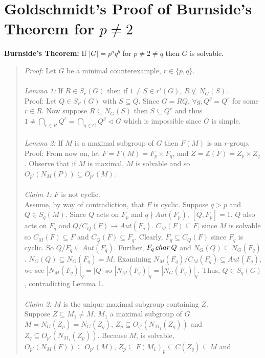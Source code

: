 \section{Goldschmidt's Proof of Burnside's Theorem for $p \ne 2$}
{\bf Burnside's Theorem:}  If $|G|= p^a q^b$ for $p \ne 2 \ne q$ then $G$ is solvable.
\begin{quote}
\emph{Proof:}
Let $G$ be a minimal counterexample, $r \in \{ p , q \}$.
\\
\\
\emph {Lemma 1:}  If $R \in S_r(G)$ then if $1 \ne S \in r'(G)$, $R \nsubseteq N_G(S)$.\\
Proof: Let $Q \in S_{r'}(G)$ with $S \subseteq Q$.  Since $G=RQ$, $\forall g, Q^g=Q^r$ for some
$r \in R$.  Now suppose $R \subseteq N_G(S)$ then $S \subseteq Q^r$ and thus
$1 \ne \bigcap_{r \in R} Q^r = \bigcap_{g \in G} Q^g \lhd G$ which is impossible since $G$
is simple.
\\
\\
\emph {Lemma 2:}  If $M$ is a maximal subgroup of $G$ then $F(M)$ is an $r$-group.\\
Proof:
From now on, let $F=F(M)= F_p \times F_q$, and $Z={\mathbb Z}(F) = Z_p \times Z_q$.
Observe that if $M$ is maximal, $M$ is solvable and so
$O_{p'}(N_M(P)) \subseteq O_{p'}(M)$.
\\
\\
\emph{Claim 1:}  $F$ is not cyclic.\\
Assume, by way of contradiction, that $F$ is cyclic.
Suppose $q > p$ and $Q \in S_q(M)$.  Since $Q$ acts on $F_p$ and $q \nmid Aut(F_p)$, $[Q, F_p]=1$.
$Q$ also acts on $F_q$ and
$Q/C_Q(F) \rightarrow Aut(F_q)$.
$C_M(F) \subseteq F$, since $M$ is solvable so $C_M(F) \subseteq F$ and $C_Q(F) \subseteq F_q$.  Clearly,
$F_q \subseteq C_Q(F)$ since $F_q$ is cyclic. So $Q/F_q \subseteq Aut(F_q)$.  Further, $F_q \thinspace char \thinspace Q$ and
$N_G(Q) \subseteq N_G(F_q)$.  $N_G(Q) \subseteq N_G(F_q) = M $.  Examining $N_M(F_q)/C_M(F_q) \subseteq Aut(F_q)$, we see $|N_M(F_q)|_q = |Q|$ so
$|N_M(F_q)|_q = |N_G(F_q)|_q$.
Thus, $Q \in S_q(G)$, contradicting Lemma 1.
\\
\\
\emph{Claim 2:}  $M$ is the unique maximal subgroup containing $Z$.
\\
Suppose $Z \subseteq M_1 \ne M$. $M_1$ a maximal subgroup of $G$.
$M= N_G(Z_p)= N_G(Z_q)$, $Z_p \subseteq O_{q'}(N_{M_1}(Z_q))$ and
$Z_q \subseteq O_{p'}(N_{M_1}(Z_p))$.
Because $M$, is solvable, $O_{p'}(N_M(F)) \subseteq O_{p'}(M)$,
$Z_p \subseteq F(M_1)_p \subseteq C(Z_q) \subseteq M$ and

\end{quote}

